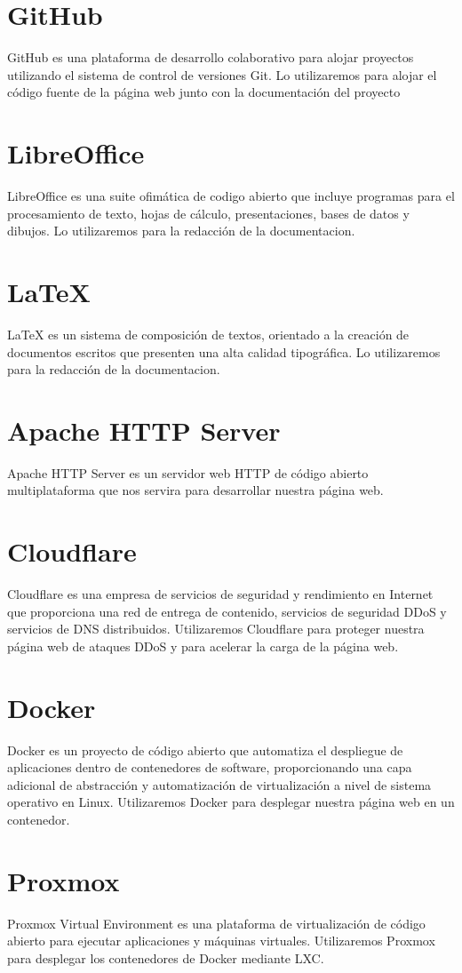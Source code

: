 \documentclass{report}
\begin{document}
        \section*{GitHub}
            GitHub es una plataforma de desarrollo colaborativo para alojar proyectos utilizando el sistema de control de versiones Git. Lo utilizaremos para alojar el código fuente de la página web junto con la documentación del proyecto
        \section*{LibreOffice}
            LibreOffice es una suite ofimática de codigo abierto que incluye programas para el procesamiento de texto, hojas de cálculo, presentaciones, bases de datos y dibujos. Lo utilizaremos para la redacción de la documentacion.
        \section*{LaTeX}
            LaTeX es un sistema de composición de textos, orientado a la creación de documentos escritos que presenten una alta calidad tipográfica. Lo utilizaremos para la redacción de la documentacion.
        \section*{Apache HTTP Server}
            Apache HTTP Server es un servidor web HTTP de código abierto multiplataforma que nos servira para desarrollar nuestra página web.
        \section*{Cloudflare}
            Cloudflare es una empresa de servicios de seguridad y rendimiento en Internet que proporciona una red de entrega de contenido, servicios de seguridad DDoS y servicios de DNS distribuidos. Utilizaremos Cloudflare para proteger nuestra página web de ataques DDoS y para acelerar la carga de la página web.
        \section*{Docker}
            Docker es un proyecto de código abierto que automatiza el despliegue de aplicaciones dentro de contenedores de software, proporcionando una capa adicional de abstracción y automatización de virtualización a nivel de sistema operativo en Linux. Utilizaremos Docker para desplegar nuestra página web en un contenedor.
        \section*{Proxmox}
            Proxmox Virtual Environment es una plataforma de virtualización de código abierto para ejecutar aplicaciones y máquinas virtuales. Utilizaremos Proxmox para desplegar los contenedores de Docker mediante LXC.
\end{document}
